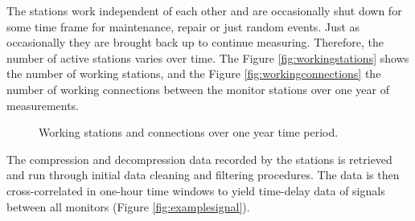 \documentclass[12pt, sumlimits, intlimits]{article}
\begin{document}
The stations work independent of each other and are occasionally shut down for some time frame for maintenance, repair or just random events. Just as occasionally they are brought back up to continue measuring.  Therefore, the number of active stations varies over time. The Figure \ref{fig:workingstations} shows the number of working stations, and the Figure \ref{fig:workingconnections} the number of working connections between the monitor stations over one year of measurements. 

\begin{figure}[ht] 
	\centering 
	\caption{Working stations and connections over one year time period. }
	\label{fig:workingmonitors}
\end{figure}

The compression and decompression data recorded by the stations is retrieved and run through initial data cleaning and filtering procedures. The data is then cross-correlated in one-hour time windows to yield time-delay data of signals between all monitors (Figure \ref{fig:examplesignal}). 
\end{document}
